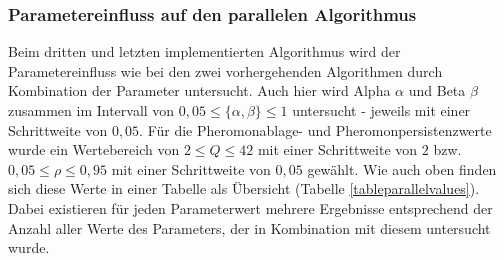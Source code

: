 \documentclass[doktyp=barbeit, sprache=german]{TUBAFarbeiten}
\begin{document}
\subsubsection{Parametereinfluss auf den parallelen Algorithmus}
Beim dritten und letzten implementierten Algorithmus wird der Parametereinfluss wie bei den zwei vorhergehenden Algorithmen durch Kombination der Parameter untersucht. Auch hier wird Alpha $\alpha$ und Beta $\beta$ zusammen im Intervall von $0,05 \leq \{\alpha,\beta\} \leq 1$ untersucht - jeweils mit einer Schrittweite von $0,05$. Für die Pheromonablage- und Pheromonpersistenzwerte wurde ein Wertebereich von $2 \leq Q \leq 42$ mit einer Schrittweite von $2$ bzw. $0,05 \leq \rho \leq 0,95$ mit einer Schrittweite von $0,05$ gewählt.
Wie auch oben finden sich diese Werte in einer Tabelle als Übersicht (Tabelle \ref{tableparallelvalues}). Dabei existieren für jeden Parameterwert mehrere Ergebnisse entsprechend der Anzahl aller Werte des Parameters, der in Kombination mit diesem untersucht wurde. 
\begin{table}[]
\centering
{}
\caption[Übersicht über die Parameterwerte für die Untersuchung der Abhängigkeit der einzelnen Parameter bei Betrachtung des parallelen Algorithmus zur Tourkonstruktion]{Übersicht über die Parameterwerte für die Untersuchung der Abhängigkeit der einzelnen Parameter bei Betrachtung des parallelen Algorithmus zur Tourkonstruktion. Die Spalte \glqq Parameterwert bei Untersuchung der anderen Algorithmen\grqq\, gibt an, welche Wert für Alpha $\alpha$ und Beta $\beta$ bei Untersuchung der Pheromonablagemenge und der Pheromonpersistenz gewählt wurde und umgekehrt.}
\label{tableparallelvalues}
\end{table}
\end{document}
